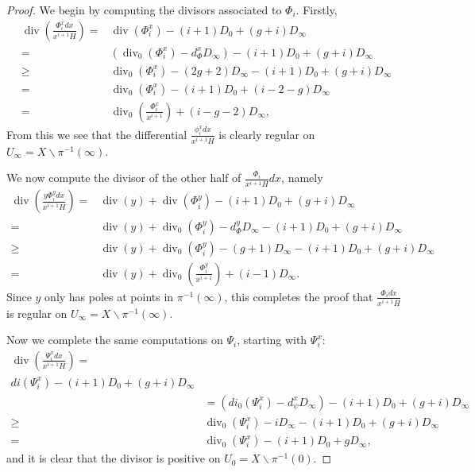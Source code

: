 \documentclass[draft, 11pt]{article} %
\theoremstyle{plain}
\theoremstyle{remark}
\DeclareMathOperator{\di}{div}
\begin{document}
\begin{proof}
We begin by computing the divisors associated to $\Phi_i$.
Firstly,
\begin{align*}
\di \left( \frac{\Phi_i^x dx}{x^{i+1} H} \right)  = &  \di(\Phi_i^x) -(i+1)D_0 + (g+i)D_\infty\\
 = & \left( \di_0(\Phi_i^x) -d_\Phi^xD_\infty\right) -(i+1)D_0 + (g+i)D_\infty\\
 \geq & \di_0(\Phi_i^x) - (2g+2)D_\infty - (i+1)D_0 + (g+i)D_\infty \\
 = &  \di_0(\Phi_i^x) - (i+1)D_0 + (i-2-g)D_\infty \\
 =  & \di_0 \left( \frac{\Phi_i^x}{x^{i+1}} \right) + (i-g-2)D_\infty,
\end{align*}
From this we see that the differential $\frac{\phi_i^xdx}{x^{i+1}H}$ is clearly regular on $U_\infty = X \backslash \pi^{-1}(\infty)$.

We now compute the divisor of the other half of $\frac{\Phi_i}{x^{i+1}H}dx$, namely
\begin{align*}
\di\left(\frac{y\Phi_i^y dx}{x^{i+1}H} \right)  = & \di(y) + \di(\Phi_i^y) -(i+1)D_0 + (g+i)D_\infty\\
 = & \di(y) + \di_0(\Phi_i^y) - d_\Phi^yD_\infty -(i+1)D_0 + (g+i)D_\infty \\
 \geq & \di(y) + \di_0(\Phi_i^y) - (g+1)D_\infty - (i+1)D_0 + (g+i)D_\infty \\
 = & \di(y) + \di_0\left(\frac{\Phi_i^y}{x^{i+1}} \right) + (i-1)D_\infty.
\end{align*}
Since $y$ only has poles at points in $\pi^{-1}(\infty)$, this completes the proof that $\frac{\Phi_i dx}{x^{i+1}H}$ is regular on $U_\infty = X \backslash \pi^{-1}(\infty)$.

Now we complete the same computations on $\Psi_i$, starting with $\Psi_i^x$:
\begin{align*}
\di\left( \frac{\Psi_i^x dx}{x^{i+1}H} \right)  = &  \\di(\Psi_i^x)  - (i+1)D_0 + (g+i)D_\infty \\
& = (di_0(\Psi_i^x) -d_\psi^xD_\infty) - (i+1)D_0 + (g+i)D_\infty \\
 \geq &  \di_0(\Psi_i^x ) - iD_\infty - (i+1)D_0 + (g+i)D_\infty \\
 = &  \di_0(\Psi_i^x) - (i+1)D_0 + gD_\infty,
\end{align*}
and it is clear that the divisor is positive on $U_0 = X \backslash \pi^{-1}(0)$.


\end{proof}
\end{document}
